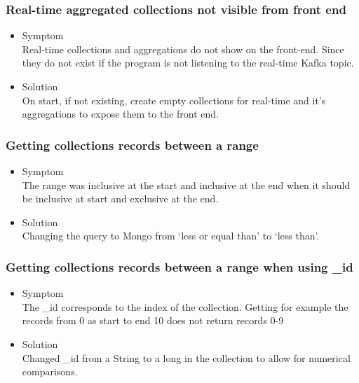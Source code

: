 \documentclass[oneside, english, final]{design}
\begin{document}
\subsubsection{Real-time  aggregated collections not visible from front end}

\begin{itemize}
      \item{Symptom
            \\
            Real-time collections and aggregations do not show on the front-end. Since they do not exist if the program is not listening to the real-time Kafka topic.
	}
      \item{Solution
            \\
            On start, if not existing, create empty collections for real-time and it's aggregations to expose them to the front end.
            }
\end{itemize}

\subsubsection{Getting collections records between a range}



\begin{itemize}
      \item{Symptom
            \\
            The range was inclusive at the start and inclusive at the end when it should be inclusive at start and exclusive at the end.
	}
      \item{Solution
            \\
            Changing the query to Mongo from `less or equal than' to `less than'.
            }
\end{itemize}

\subsubsection{Getting collections records between a range when using \_id }

\begin{itemize}
      \item{Symptom
            \\
            The \_id corresponds to the index of the collection. Getting for example the records from 0 as start to end 10 does not return records 0-9
	}
      \item{Solution
            \\
            Changed \_id from a String to a long in the collection to allow for numerical comparisons.
            }
\end{itemize}
\end{document}
